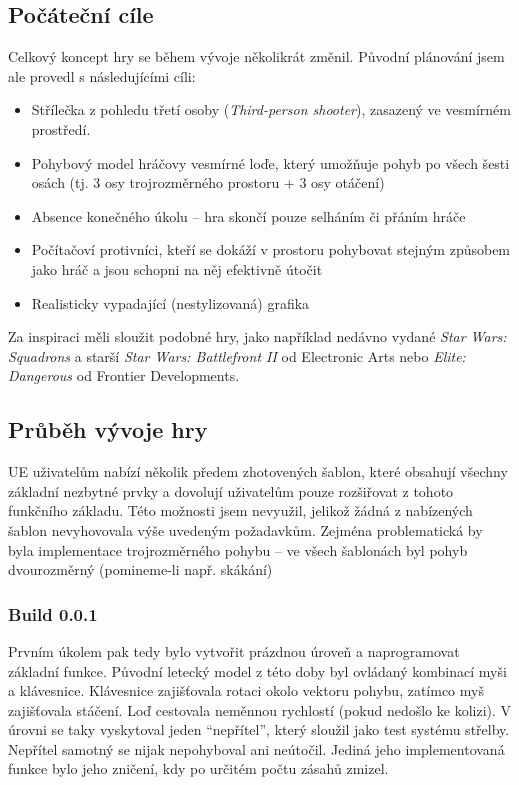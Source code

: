 \documentclass[12pt,a4paper,hidelinks]{article}
\begin{document}
\subsection{Počáteční cíle}
Celkový koncept hry se během vývoje několikrát změnil. Původní plánování jsem ale provedl s následujícími cíli:
\begin{itemize}
	\item Střílečka z pohledu třetí osoby (\textit{Third-person shooter}), zasazený ve vesmírném prostředí.\\
	\item Pohybový model hráčovy vesmírné loďe, který umožňuje pohyb po všech šesti osách (tj. 3 osy trojrozměrného prostoru + 3 osy otáčení)\\
	\item Absence konečného úkolu – hra skončí pouze selháním či přáním hráče\\
	\item Počítačoví protivníci, kteří se dokáží v prostoru pohybovat stejným způsobem jako hráč a jsou schopni na něj efektivně útočit\\
	\item Realisticky vypadající (nestylizovaná) grafika\\
\end{itemize}

Za inspiraci měli sloužit podobné hry, jako například nedávno vydané \textit{Star Wars: Squadrons} a starší \textit{Star Wars: Battlefront II} od Electronic Arts nebo \textit{Elite: Dangerous} od Frontier Developments.\\

\subsection{Průběh vývoje hry}
UE uživatelům nabízí několik předem zhotovených šablon, které obsahují všechny základní nezbytné prvky a dovolují uživatelům pouze rozšiřovat z tohoto funkčního základu. Této možnosti jsem nevyužil, jelikož žádná z nabízených šablon nevyhovovala výše uvedeným požadavkům. Zejména problematická by byla implementace trojrozměrného pohybu – ve všech šablonách byl pohyb dvourozměrný (pomineme-li např. skákání)\\
\subsubsection{Build 0.0.1}
Prvním úkolem pak tedy bylo vytvořit prázdnou úroveň a naprogramovat základní funkce. Původní letecký model z této doby byl ovládaný kombinací myši a klávesnice. Klávesnice zajišťovala rotaci okolo vektoru pohybu, zatímco myš zajišťovala stáčení. Loď cestovala neměnnou rychlostí (pokud nedošlo ke kolizi). V úrovni se taky vyskytoval jeden \enquote{nepřítel}, který sloužil jako test systému střelby. Nepřítel samotný se nijak nepohyboval ani neútočil. Jediná jeho implementovaná funkce bylo jeho zničení, kdy po určitém počtu zásahů zmizel.\\
\end{document}
